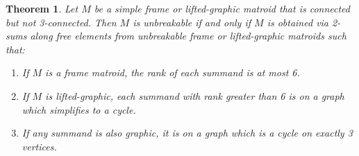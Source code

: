 \documentclass[12pt]{article}
\newtheorem{theorem}{Theorem}[section]
\theoremstyle{definition}
\theoremstyle{plain} %
\begin{document}
\begin{theorem}
    Let $M$ be a simple frame or lifted-graphic matroid that is connected but not 3-connected. Then $M$ is unbreakable if and only if $M$ is obtained via 2-sums along free elements from unbreakable frame or lifted-graphic matroids such that:
    \begin{enumerate}[$(i)$]
        \item If $M$ is a frame matroid, the rank of each summand is at most 6.
        \item If $M$ is lifted-graphic, each summand with rank greater than 6 is on a graph which simplifies to a cycle.
        \item If any summand is also graphic, it is on a graph which is a cycle on exactly 3 vertices.
    \end{enumerate}
\end{theorem}
\end{document}
